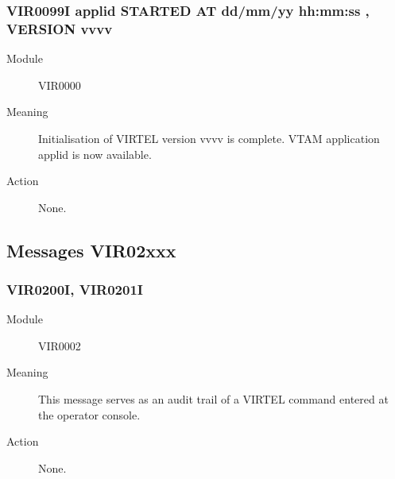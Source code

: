 \documentclass[letterpaper,10pt,english]{sphinxmanual}
\begin{document}
\subsubsection{VIR0099I applid STARTED AT dd/mm/yy hh:mm:ss , VERSION vvvv}
\label{\detokenize{messages:vir0099i-applid-started-at-dd-mm-yy-hh-mm-ss-version-vvvv}}\begin{description}
\item[{Module}] \leavevmode
VIR0000

\item[{Meaning}] \leavevmode
Initialisation of VIRTEL version vvvv is complete. VTAM application applid is now available.

\item[{Action}] \leavevmode
None.

\end{description}


\subsection{Messages VIR02xxx}
\label{\detokenize{messages:messages-vir02xxx}}

\subsubsection{VIR0200I, VIR0201I}
\label{\detokenize{messages:vir0200i-vir0201i}}\begin{description}
\item[{Module}] \leavevmode
VIR0002

\item[{Meaning}] \leavevmode
This message serves as an audit trail of a VIRTEL command entered at the operator console.

\item[{Action}] \leavevmode
None.

\end{description}
\end{document}
